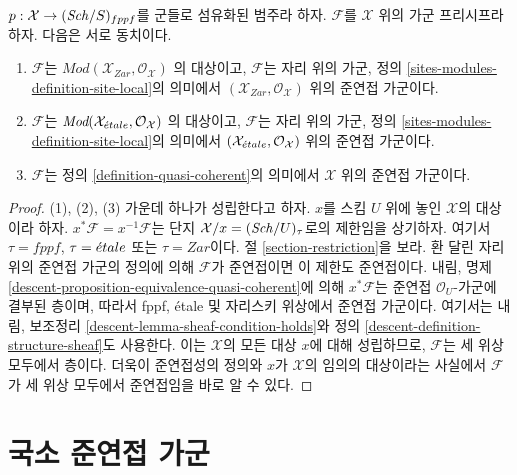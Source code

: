 \begin{lemma}
\label{lemma-characterize-quasi-coherent-bis}
$p : \mathcal{X} \to (\mathit{Sch}/S)_{fppf}$를 군들로 섬유화된 범주라 하자.
$\mathcal{F}$를 $\mathcal{X}$ 위의 가군 프리시프라 하자.
다음은 서로 동치이다.
\begin{enumerate}
\item $\mathcal{F}$는
$\textit{Mod}(\mathcal{X}_{Zar}, \mathcal{O}_\mathcal{X})$
의 대상이고, $\mathcal{F}$는 자리 위의 가군, 정의
\ref{sites-modules-definition-site-local}의 의미에서
$(\mathcal{X}_{Zar}, \mathcal{O}_\mathcal{X})$ 위의 준연접 가군이다.
\item $\mathcal{F}$는
$\textit{Mod}(\mathcal{X}_{\acute{e}tale}, \mathcal{O}_\mathcal{X})$
의 대상이고, $\mathcal{F}$는 자리 위의 가군, 정의
\ref{sites-modules-definition-site-local}의 의미에서
$(\mathcal{X}_{\acute{e}tale}, \mathcal{O}_\mathcal{X})$ 위의 준연접 가군이다.
\item $\mathcal{F}$는 정의 \ref{definition-quasi-coherent}의 의미에서
$\mathcal{X}$ 위의 준연접 가군이다.
\end{enumerate}
\end{lemma}

\begin{proof}
(1), (2), (3) 가운데 하나가 성립한다고 하자.
$x$를 스킴 $U$ 위에 놓인 $\mathcal{X}$의 대상이라 하자.
$x^*\mathcal{F} = x^{-1}\mathcal{F}$는 단지
$\mathcal{X}/x = (\mathit{Sch}/U)_\tau$로의 제한임을 상기하자. 여기서
$\tau = fppf$, $\tau = {\acute{e}tale}$ 또는 $\tau = Zar$이다.
절 \ref{section-restriction}을 보라.
환 달린 자리 위의 준연접 가군의 정의에 의해 $\mathcal{F}$가
준연접이면 이 제한도 준연접이다. 내림, 명제
\ref{descent-proposition-equivalence-quasi-coherent}에 의해
$x^*\mathcal{F}$는 준연접 $\mathcal{O}_U$-가군에 결부된 층이며,
따라서 fppf, \'etale 및 자리스키 위상에서 준연접 가군이다.
여기서는 내림, 보조정리 \ref{descent-lemma-sheaf-condition-holds}와
정의 \ref{descent-definition-structure-sheaf}도 사용한다.
이는 $\mathcal{X}$의 모든 대상 $x$에 대해 성립하므로,
$\mathcal{F}$는 세 위상 모두에서 층이다. 더욱이 준연접성의 정의와
$x$가 $\mathcal{X}$의 임의의 대상이라는 사실에서
$\mathcal{F}$가 세 위상 모두에서 준연접임을 바로 알 수 있다.
\end{proof}







\section{국소 준연접 가군}
\label{section-locally-quasi-coherent}

